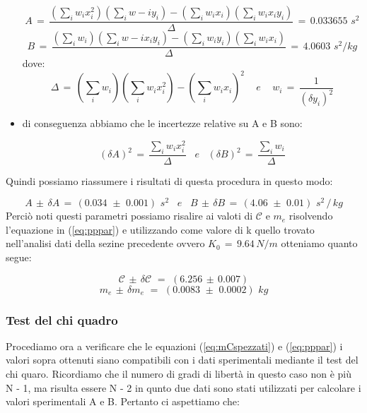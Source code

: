 \begin{itemize}
{		\begin{equation*}
			A \,=\, \frac{(\sum_i w_i x_i^2)(\sum_i w-i y_i) - (\sum_i w_i x_i)(\sum_i w_i x_i y_i)}{\Delta} \,=\, 0.033655 \,\, s^2
		\end{equation*}
		\begin{equation*}
			B \,=\, \frac{(\sum_i w_i)(\sum_i w-i x_i y_i) - (\sum_i w_i y_i)(\sum_i w_i x_i)}{\Delta} \,=\, 4.0603 \,\, s^2 / kg
		\end{equation*}
		dove:
		\begin{equation*}
			\Delta \,=\, (\sum_i w_i)(\sum_i w_i x_i^2) - (\sum_i w_i x_i)^2 \,\,\,\,\,\,\, e \,\,\,\,\,\,\,
			w_i \,=\, \frac{1}{(\delta y_i)^2}
		\end{equation*}}
\item{di conseguenza abbiamo che le incertezze relative su A e B sono:

		\begin{equation*}
			(\delta A)^2 \,=\, \frac{\sum_i w_i x_i^2}{\Delta}  \,\,\,\,\, e \,\,\,\,\,
			(\delta B)^2 \,=\, \frac{\sum_i w_i}{\Delta} 
		\end{equation*}}
\end{itemize} 
Quindi possiamo riassumere i risultati di questa procedura in questo modo:

\begin{equation*}
	A \,\pm\, \delta A \,=\, (0.034 \,\, \pm \,\, 0.001) \,\,s^2 \,\,\,\,\, e \,\,\,\,\,
	B \,\pm\, \delta B \,=\, (4.06 \,\, \pm \,\, 0.01) \,\,s^2 \,/\, kg
\end{equation*}
%
Perciò noti questi parametri possiamo risalire ai valoti di $\mathcal{C}$ e $m_e$ risolvendo l'equazione in (\ref{eq:pppar}) e utilizzando come valore di k quello trovato nell'analisi dati della sezine precedente ovvero $K_0 \,=\, 9.64 \, N/m$ otteniamo quanto segue:

\begin{equation*}
	\mathcal{C} \,\pm\, \delta \mathcal{C} \,\,=\,\, (6.256 \, \pm \, 0.007)
\end{equation*}
%
\begin{equation*}
	m_e \, \pm \, \delta m_e \,\,=\,\, (0.0083 \,\, \pm \,\, 0.0002) \,\, kg
\end{equation*}

\subsubsection{Test del chi quadro}
Procediamo ora a verificare che le equazioni (\ref{eq:mCspezzati}) e (\ref{eq:pppar}) i valori sopra ottenuti siano compatibili con i dati sperimentali mediante il test del chi quaro. Ricordiamo che il numero di gradi di libertà in questo caso non è più N - 1, ma risulta essere N - 2 in qunto due dati sono stati utilizzati per calcolare i  valori sperimentali A e B. Pertanto ci aspettiamo che:

